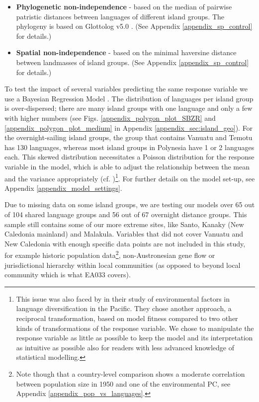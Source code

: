 \documentclass[unnumsec,webpdf,modern,medium]{oup-authoring-template}
\begin{document}
\begin{itemize}
\begin{itemize}
 \item \textbf{Phylogenetic non-independence} - based on the median of pairwise patristic distances between languages of different island groups. The phylogeny is based on Glottolog v5.0 \citep{Glottolog5}. (See Appendix \ref{appendix_sp_control} for details.)
 
\item \textbf{Spatial non-independence} - based on the minimal haversine distance between landmasses of island groups. (See Appendix \ref{appendix_sp_control} for details.)

\end{itemize}
\end{itemize}


To test the impact of several variables predicting the same response variable we use a Bayesian Regression Model \citep{gelman2006data, burkner2017brms}. The distribution of languages per island group is over-dispersed; there are many island groups with one language and only a few with higher numbers (see Figs. \ref{appendix_polygon_plot_SBZR} and \ref{appendix_polygon_plot_medium} in Appendix \ref{appendix_sec:island_geo}). For the overnight-sailing island groups, the group that contains Vanuatu and Temotu has 130 languages, whereas most island groups in Polynesia have 1 or 2 languages each. This skewed distribution necessitates a Poisson distribution for the response variable in the model, which is able to adjust the relationship between the mean and the variance appropriately (cf. \citet{winter2021poisson})\footnote{This issue was also faced by \citet{gavin2012island} in their study of environmental factors in language diversification in the Pacific. They chose another approach, a reciprocal transformation, based on model fitness compared to two other kinds of transformations of the response variable. We chose to manipulate the response variable as little as possible to keep the model and its interpretation as intuitive as possible also for readers with less advanced knowledge of statistical modelling.}. For further details on the model set-up, see Appendix \ref{appendix_model_settings}.

Due to missing data on some island groups, we are testing our models over 65 out of 104 shared language groups and 56 out of 67 overnight distance groups. This sample still contains some of our more extreme sites, like Santo, Kanaky (New Caledonia mainland) and Malakula. Variables that did not cover Vanuatu and New Caledonia with enough specific data points are not included in this study, for example historic population data\footnote{Note though that a country-level comparison shows a moderate correlation between population size in 1950 and one of the environmental PC, see Appendix \ref{appendix_pop_vs_languages}.}, non-Austronesian gene flow or jurisdictional hierarchy within local communities (as opposed to beyond local community which is what EA033 covers). 
\end{document}
